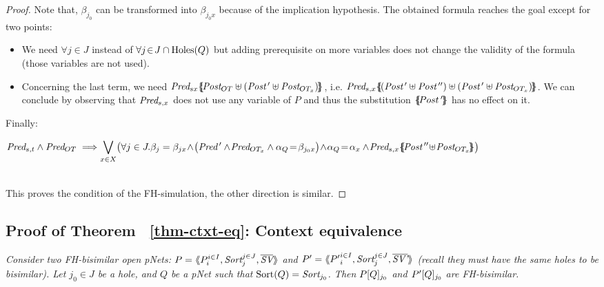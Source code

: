 \documentclass{lmcs}
\newcommand{\TODO}[1]{\textcolor{red}{\textbf{[TODO:#1]}}}
\begin{document}
\begin{proof}
 Note that, $\beta_{j_0}$ can be transformed into  $\beta_{j_0 x}$ because of the 
 implication hypothesis.
% 
 The obtained formula reaches the goal except for 
 two points:
 \begin{itemize}
 	\item We need $\forall j\!\in\! J$ instead of $\forall j\!\in\! J\cap\operatorname{Holes}(Q)$  but  
 	adding prerequisite on more variables 
 	does not   	change the validity of the formula (those variables are not used).
 	\item Concerning the last term, we need 
 	$\Pred_{s x}\subst{\Post_{OT}\uplus(\Post\,'\uplus \Post_{OT_x})}$, i.e.
 	$\Pred_{s, x}\subst{(\Post\,'\uplus 	\Post\,'')\uplus(\Post\,'\uplus \Post_{OT_x})}$. We 
 	can conclude by observing that	$\Pred_{s,x}$ does not use any variable of $P$ 
 	and thus the substitution $\{\hspace{-0.88ex}\{\!Post\,'\!\}\hspace{-0.87ex}\}$ has no effect on it.
 \end{itemize}	
Finally: \\
\begin{small} $\Pred_{s,t} \land \Pred_{OT} \implies\\
{\displaystyle\bigvee_{x\in X}
 		\!\left( \forall j\in J. \beta_j=\beta_{jx} \! \land\! 
 		\big(\Pred\,'\land\! \Pred_{OT_x}
 		 \land \alpha_Q\!=\!\beta_{j_0 x}\right)\! \land\! \alpha_Q\!=\!\alpha_x\land\!  \Pred_{s, x}\subst{\Post\,''\!\uplus\!\Post_{OT_x}}\big)
 		}$
 		\end{small}\\
This proves the  condition of the FH-simulation, the other direction is 
 similar.
\end{proof}

        \subsection{Proof of Theorem ~\ref{thm-ctxt-eq}: Context equivalence}
\textit{	Consider two FH-bisimilar open pNets:
	$\pNet = \mylangle \pNet_i^{i\in I}, \Sort_j^{j\in J}, 
	\set{\symb{SV}}\myrangle$ and 	$\pNet' = \mylangle {\pNet'}_i^{i\in I}, 
	\Sort_j^{j\in 
	J}, 	\set{\symb{SV'}}\myrangle$ 
	(recall they must have the same holes to be bisimilar).
	Let $j_0\in J$ be a hole, and $Q$ be a pNet such that $\Sortop(Q)=\Sort_{j_0}$. Then 
	$P[Q]_{j_0}$ and 
	$P'[Q]_{j_0}$ are FH-bisimilar.
}
\end{document}
